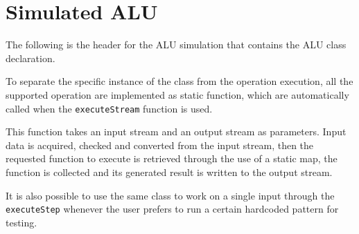\section{Simulated ALU}
\label{appendix:simulated-alu}
The following is the header for the ALU simulation that contains the ALU class declaration.

To separate the specific instance of the class from the operation execution, all the supported operation are
implemented as static function, which are automatically called when the \texttt{executeStream} function is used.

This function takes an input stream and an output stream as parameters. Input data is acquired, checked and converted
from the input stream, then the requested function to execute is retrieved through the use of a static map, the
function is collected and its generated result is written to the output stream.

It is also possible to use the same class to work on a single input through the \texttt{executeStep} whenever the user
prefers to run a certain hardcoded pattern for testing.

